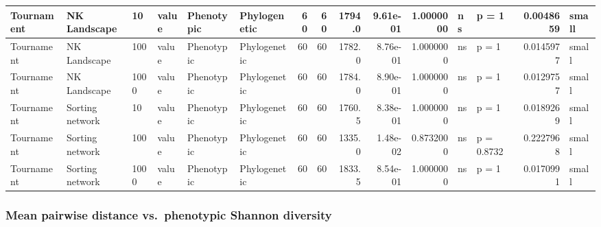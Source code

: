 \documentclass[]{book}
\begin{document}
\begin{table}
\begin{tabular}[t]{l|l|l|l|l|l|r|r|r|r|r|l|l|r|l}
\hline
Tournament & NK Landscape & 10 & value & Phenotypic & Phylogenetic & 60 & 60 & 1794.0 & 9.61e-01 & 1.0000000 & ns & p = 1 & 0.0048659 & small\\
\hline
Tournament & NK Landscape & 100 & value & Phenotypic & Phylogenetic & 60 & 60 & 1782.0 & 8.76e-01 & 1.0000000 & ns & p = 1 & 0.0145977 & small\\
\hline
Tournament & NK Landscape & 1000 & value & Phenotypic & Phylogenetic & 60 & 60 & 1784.0 & 8.90e-01 & 1.0000000 & ns & p = 1 & 0.0129757 & small\\
\hline
Tournament & Sorting network & 10 & value & Phenotypic & Phylogenetic & 60 & 60 & 1760.5 & 8.38e-01 & 1.0000000 & ns & p = 1 & 0.0189269 & small\\
\hline
Tournament & Sorting network & 100 & value & Phenotypic & Phylogenetic & 60 & 60 & 1335.0 & 1.48e-02 & 0.8732000 & ns & p = 0.8732 & 0.2227968 & small\\
\hline
Tournament & Sorting network & 1000 & value & Phenotypic & Phylogenetic & 60 & 60 & 1833.5 & 8.54e-01 & 1.0000000 & ns & p = 1 & 0.0170991 & small\\
\hline
\end{tabular}
\end{table}

\hypertarget{mean-pairwise-distance-vs.phenotypic-shannon-diversity}{%
\subsubsection{Mean pairwise distance vs.~phenotypic Shannon diversity}\label{mean-pairwise-distance-vs.phenotypic-shannon-diversity}}
\end{document}
